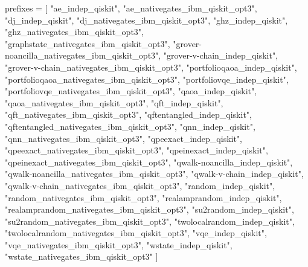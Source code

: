 prefixes = [ 
    "ae_indep_qiskit", "ae_nativegates_ibm_qiskit_opt3",
    "dj_indep_qiskit", "dj_nativegates_ibm_qiskit_opt3",
    "ghz_indep_qiskit", "ghz_nativegates_ibm_qiskit_opt3",
    "graphstate_nativegates_ibm_qiskit_opt3",
    "grover-noancilla_nativegates_ibm_qiskit_opt3",
    "grover-v-chain_indep_qiskit", "grover-v-chain_nativegates_ibm_qiskit_opt3",
    "portfolioqaoa_indep_qiskit", "portfolioqaoa_nativegates_ibm_qiskit_opt3",
    "portfoliovqe_indep_qiskit", "portfoliovqe_nativegates_ibm_qiskit_opt3",
    "qaoa_indep_qiskit", "qaoa_nativegates_ibm_qiskit_opt3",
    "qft_indep_qiskit", "qft_nativegates_ibm_qiskit_opt3",
    "qftentangled_indep_qiskit", "qftentangled_nativegates_ibm_qiskit_opt3",
    "qnn_indep_qiskit", "qnn_nativegates_ibm_qiskit_opt3",
    "qpeexact_indep_qiskit", "qpeexact_nativegates_ibm_qiskit_opt3",
    "qpeinexact_indep_qiskit", "qpeinexact_nativegates_ibm_qiskit_opt3",
    "qwalk-noancilla_indep_qiskit", "qwalk-noancilla_nativegates_ibm_qiskit_opt3",
    "qwalk-v-chain_indep_qiskit", "qwalk-v-chain_nativegates_ibm_qiskit_opt3",
    "random_indep_qiskit", "random_nativegates_ibm_qiskit_opt3",
    "realamprandom_indep_qiskit", "realamprandom_nativegates_ibm_qiskit_opt3",
    "su2random_indep_qiskit", "su2random_nativegates_ibm_qiskit_opt3",
    "twolocalrandom_indep_qiskit", "twolocalrandom_nativegates_ibm_qiskit_opt3",
    "vqe_indep_qiskit", "vqe_nativegates_ibm_qiskit_opt3",
    "wstate_indep_qiskit", "wstate_nativegates_ibm_qiskit_opt3"
]